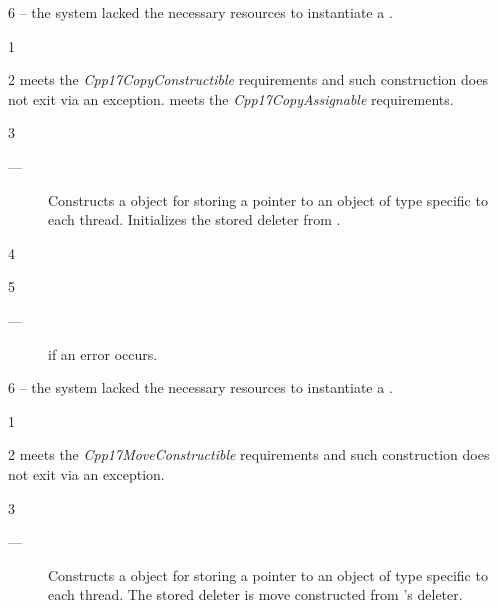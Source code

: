 \documentclass[fontsize=10pt,paper=A4,pagesize,DIV=15]{scrartcl}
\begin{document}
6 \errors
{} -- the system lacked the necessary
resources to instantiate a \tptr.


1 \constraints
{}

2 \precond
{} meets the \emph{Cpp17CopyConstructible} requirements and such
construction does not exit via an exception.
 meets the \emph{Cpp17CopyAssignable} requirements.

3 \effects
\begin{description}
    \item[---] Constructs a  object for storing a
               pointer to an object of type  specific to each thread.
               Initializes the stored deleter from
               .
\end{description}

4 \postcond
{}

5 \except
\begin{description}
    \item[---]  if an error occurs.
\end{description}

6 \errors
{} -- the system lacked the necessary
resources to instantiate a \tptr.


1 \constraints
{}

2 \precond
{} meets the \emph{Cpp17MoveConstructible} requirements and such
construction does not exit via an exception.

3 \effects
\begin{description}
    \item[---] Constructs a  object for storing a
               pointer to an object of type  specific to each thread.
               The stored deleter is move constructed from 's deleter.
\end{description}
\end{document}
